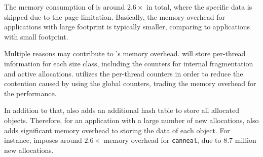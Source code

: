 The memory consumption of \MP{} is around $2.6\times$ in total, where the specific data is skipped due to the page limitation. Basically, the memory overhead for applications with large footprint is typically smaller, comparing to applications with small footprint. 

Multiple reasons may contribute to \MP{}'s memory overhead.  \MP{} will store per-thread information for each size class, including the counters for internal fragmentation and active allocations. \MP{} utilizes the per-thread counters in order to reduce the contention caused by using the global counters, trading the memory overhead for the performance. 

In addition to that, \MP{} also adds an additional hash table to store all allocated objects. Therefore, for an application with a large number of new allocations, \MP{} also adds significant memory overhead to storing the data of each object. For instance, \MP{} imposes around $2.6\times$ memory overhead for \texttt{canneal}, due to 8.7 million new allocations. 
 





